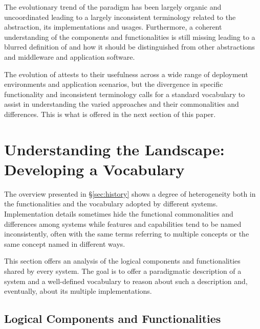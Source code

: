 \documentclass{sig-alternate}
\begin{document}
The evolutionary trend of the \pilot paradigm has been largely organic and
uncoordinated leading to a largely inconsistent terminology related to the
\pilot abstraction, its implementations and usages. Furthermore, a coherent
understanding of the \pilot components and functionalities is still missing
leading to a blurred definition of \pilot and how it should be distinguished
from other abstractions and middleware and application software.

The evolution of \pilots attests to their usefulness across a wide range of
deployment environments and application scenarios, but the divergence in
specific functionality and inconsistent terminology calls for a standard
vocabulary to assist in understanding the varied approaches and their
commonalities and differences. This is what is offered in the next section of
this paper.



\newcommand{\vocab}[1]{\textbf{#1}\xspace}
\newcommand{\prop}[1]{\textit{#1}\xspace}
\newcommand{\impterm}[1]{\texttt{#1}\xspace}

\section{Understanding the Landscape: Developing a Vocabulary}
\label{sec:understanding}

The overview presented in \S\ref{sec:history} shows a degree of heterogeneity
both in the functionalities and the vocabulary adopted by different \pilot
systems. Implementation details sometimes hide the functional commonalities and
differences among \pilot systems while features and capabilities tend to be
named inconsistently, often with the same terms referring to multiple concepts
or the same concept named in different ways.

This section offers an analysis of the logical components and functionalities
shared by every \pilot system. The goal is to offer a paradigmatic description
of a \pilot system and a well-defined vocabulary to reason about such a
description and, eventually, about its multiple implementations.

\subsection{Logical Components and Functionalities}
\label{sec:compsandfuncs}
\end{document}
